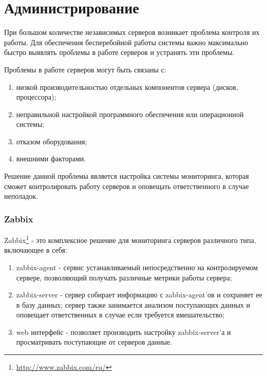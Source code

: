 \section{Администрирование}
При большом количестве независимых серверов возникает проблема контроля их
работы. Для обеспечения бесперебойной работы системы важно максимально быстро
выявлять проблемы в работе серверов и устранять эти проблемы.
	
Проблемы в работе серверов могут быть связаны с:
\begin{enumerate}
  \item низкой производительностью отдельных компонентов сервера (дисков, процессора);
  \item неправильной настройкой программного обеспечения или операционной
системы; 
  \item отказом оборудования;
  \item внешними факторами.
\end{enumerate}

Решение данной проблемы является настройка системы мониторинга, которая сможет
контролировать работу серверов и оповещать ответственного в случае неполадок.	

\subsubsection{Zabbix}
Zabbix\footnote{
	\url{http://www.zabbix.com/ru/}
} - это комплексное решение для мониторинга серверов различного типа,
включающее в себя:
\begin{enumerate}
  \item zabbix-agent - сервис устанавливаемый непосредственно на контролируемом сервере, позволяющий получать различные метрики работы сервера;
  \item zabbix-server - сервер собирает информацию с zabbix-agent’ов и сохраняет
ее в базу данных; сервер также занимается анализом поступающих данных и оповещает ответственных в случае если требуется вмешательство; 
  \item web интерфейс - позволяет производить настройку zabbix-server’а и
просматривать поступающие от серверов данные.
\end{enumerate}